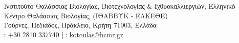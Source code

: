         {Ινστιτούτο Θαλάσσιας Βιολογίας, Βιοτεχνολογίας \& Ιχθυοκαλλιεργιών, Ελληνικό Κέντρο Θαλάσσιας Βιολογίας, (ΙΘΑΒΒΥΚ - ΕΛΚΕΘΕ) \\
        Γούρνες, Πεδιάδος, Ηράκλειο, Κρήτη 71003, Ελλάδα \\ \faPhone: +30 2810 337740 | 
        \faAt: \href{mailto:kotoulas@hcmr.gr}{kotoulas@hcmr.gr}} 


      

    





